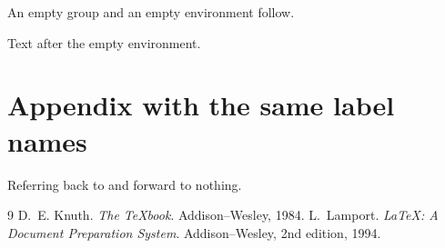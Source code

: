 \documentclass[11pt,twoside]{article}
\theoremstyle{plain}
\theoremstyle{definition}
\begin{document}
An empty group {} and an empty environment follow.

\begin{center}
\end{center}

Text after the empty environment.

\appendix

\section{Appendix with the same label names}\label{sec:appendix}

Referring back to  and forward to nothing.

\begin{thebibliography}{9}
 D.~E. Knuth. \emph{The \TeX{}book}. Addison--Wesley, 1984.
 L.~Lamport. \emph{\LaTeX: A Document Preparation
System}. Addison--Wesley, 2nd edition, 1994.
\end{thebibliography}
\end{document}
